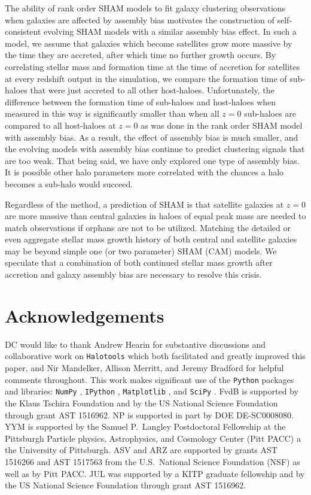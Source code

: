 \documentclass[useAMS,fleqn,usenatbib]{mnras}
\begin{document}
The ability of rank order SHAM models to fit galaxy clustering observations when galaxies are affected by assembly bias motivates the construction of self-consistent evolving SHAM models with a similar assembly bias effect.  In such a model, we assume that galaxies which become satellites grow more massive by the time they are accreted, after which time no further growth occurs.  By correlating stellar mass and formation time at the time of accretion for satellites at every redshift output in the simulation, we compare the formation time of sub-haloes that were just accreted to all other host-haloes.  Unfortunately, the difference between the formation time of sub-haloes and host-haloes when measured in this way is significantly smaller than when all $z=0$ sub-haloes are compared to all host-haloes at $z=0$ as was done in the rank order SHAM model with assembly bias.  As a result, the effect of assembly bias is much smaller, and the evolving models with assembly bias continue to predict clustering signals that are too weak. That being said, we have only explored one type of assembly bias.  It is possible other halo parameters more correlated with the chances a halo becomes a sub-halo would succeed.

Regardless of the method, a prediction of SHAM is that satellite galaxies at $z=0$ are more massive than central galaxies in haloes of equal peak mass are needed to match observations if orphans are not to be utilized.  Matching the detailed or even aggregate stellar mass growth history of both central and satellite galaxies may be beyond simple one (or two parameter) SHAM (CAM) models.  We speculate that a combination of both continued stellar mass growth after accretion and galaxy assembly bias are necessary to resolve this crisis.


\section*{Acknowledgements}

DC would like to thank Andrew Hearin for substantive discussions and collaborative work on {\tt Halotools} which both facilitated and greatly improved this paper, and Nir Mandelker, Allison Merritt, and Jeremy Bradford for helpful comments throughout.  This work makes significant use of the {\tt Python} packages and libraries: {\tt NumPy} \citep{VanDerWalt:2011dp}, {\tt IPython} \citep{Perez:2007jl}, {\tt Matplotlib} \citep{Hunter:2007jl}, and {\tt SciPy} \citep{Jones:2001uv}. FvdB is supported by the Klaus Tschira Foundation and by the US National Science Foundation through grant AST 1516962. NP is supported in part by DOE DE-SC0008080. YYM is supported by the Samuel P.\ Langley Postdoctoral Fellowship at the Pittsburgh Particle physics, Astrophysics, and Cosmology Center (Pitt PACC) a the University of Pittsburgh. ASV and ARZ are supported by grants AST 1516266 and AST 1517563 from the U.S.\ National Science Foundation (NSF) as well as by Pitt PACC. JUL was supported by a KITP graduate fellowship and by the US National Science Foundation through grant AST 1516962.
\end{document}

